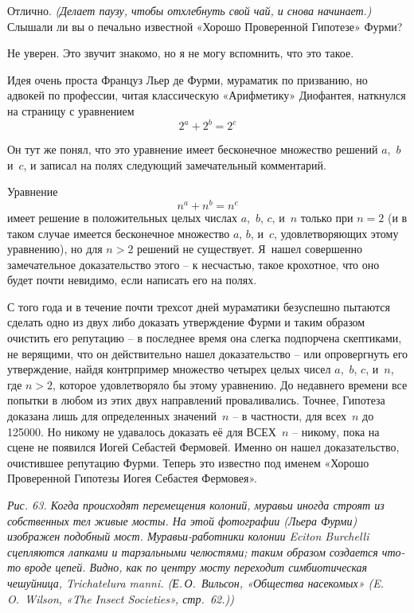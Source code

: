 \documentclass[../main.tex]{subfiles}
\begin{document}
\begin{dialogue}
 Отлично. \emph{(Делает паузу, чтобы отхлебнуть свой чай, и снова начинает.)} Слышали ли вы о печально известной «Хорошо Проверенной Гипотезе» Фурми?

 Не уверен. Это звучит знакомо, но я не могу вспомнить, что это такое.

 Идея очень проста Француз Льер де Фурми, мураматик по призванию, но адвокей по профессии, читая классическую «Арифметику» Диофантея, наткнулся на страницу с уравнением
\[
    2^{a} + 2^{b} = 2^{c}
\]

Он тут же понял, что это уравнение имеет бесконечное множество решений $a$,~$b$ и~$c$, и записал на полях следующий замечательный комментарий.

Уравнение
\[
    n^{a} + n^{b} = n^{c}
\]
имеет решение в положительных целых числах $a$,~$b$, $c$, и~$n$ только при $n = 2$ (и в таком случае имеется бесконечное множество $a$, $b$, и~$c$, удовлетворяющих этому уравнению), но для $n > 2$ решений не существует. Я~нашел совершенно замечательное доказательство этого \--- к несчастью, такое крохотное, что оно будет почти невидимо, если написать его на полях.

С того года и в течение почти трехсот дней мураматики безуспешно пытаются сделать одно из двух либо доказать утверждение Фурми и таким образом очистить его репутацию \--- в последнее время она слегка подпорчена скептиками, не верящими, что он действительно нашел доказательство \--- или опровергнуть его утверждение, найдя контрпример множество четырех целых чисел $a$,~$b$, $c$, и~$n$, где $n > 2$, которое удовлетворяло бы этому уравнению. До недавнего времени все попытки в любом из этих двух направлений проваливались. Точнее, Гипотеза доказана лишь для определенных значений~$n$ \--- в частности, для всех~$n$ до \num{125 000}. Но никому не удавалось доказать её для ВСЕХ~$n$ \--- никому, пока на сцене не появился Иогей Себастей Фермовей. Именно он нашел доказательство, очистившее репутацию Фурми. Теперь это известно под именем «Хорошо Проверенной Гипотезы Иогея Себастея Фермовея».

\emph{Рис. 63. Когда происходят перемещения колоний, муравьи иногда строят из собственных тел живые мосты. На этой фотографии (Льера Фурми) изображен подобный мост. Муравьи-работники колонии Eciton Burchelli сцепляются лапками и тарзальными челюстями; таким образом создается что-то вроде цепей. Видно, как по центру мосту переходит симбиотическая чешуйница, Trichatelura manni. (Е.\,О.~Вильсон, «Общества насекомых» (E.\,O.~Wilson, «The Insect Societies», стр.~62.))}


\end{dialogue}
\end{document}
